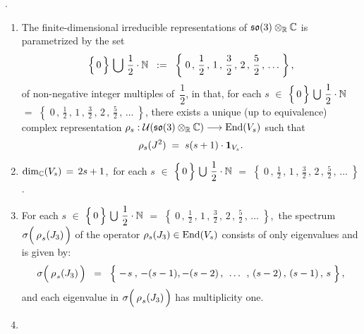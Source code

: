 
\begin{theorem}
{\color{white}.}\vskip -0.1cm
\noindent
\begin{enumerate}
\item
	The finite-dimensional irreducible representations of $\mathfrak{so}(3) \otimes_{\mathbb{R}} \mathbb{C}$ is parametrized by the set
	\begin{equation*}
	\left\{\,\overset{{\color{white}.}}{0}\,\right\} \,\bigcup\, \dfrac{1}{2} \cdot \N
	\;\; := \;\;
		\left\{\;0 \,,\, \dfrac{1}{2} \,,\, 1 \,,\, \frac{3}{2} \,,\, 2 \,,\, \frac{5}{2} \,,\, \ldots \;\right\},
	\end{equation*}
	of non-negative integer multiples of \,$\dfrac{1}{2}$, in that, for each
	$s$
	$\in$ $\left\{\,\overset{{\color{white}.}}{0}\,\right\} \,\bigcup\, \dfrac{1}{2} \cdot \N$
	$=$ $\left\{\; 0 \,,\, \frac{1}{2}\,,\, 1\,,\, \frac{3}{2}\,,\, 2\,,\, \frac{5}{2}\,,\, \ldots \;\right\}$,
	there exists a unique (up to equivalence) complex representation
	$\rho_{s} : \mathcal{U}(\mathfrak{so}(3)\otimes_{\mathbb{R}}\mathbb{C}) \longrightarrow \textnormal{End}(V_{s})$
	such that
	\begin{equation*}
	\rho_{s}(J^{2}) \; = \; s(s+1)\cdot\textnormal{\textbf{1}}_{V_{s}}.
	\end{equation*}
\item
	$\dim_{\mathbb{C}}(V_{s}) \, = \, 2s + 1$,\, for each
	$s$
	$\in$ $\left\{\,\overset{{\color{white}.}}{0}\,\right\} \,\bigcup\, \dfrac{1}{2} \cdot \N$
	$=$ $\left\{\; 0 \,,\, \frac{1}{2}\,,\, 1\,,\, \frac{3}{2}\,,\, 2\,,\, \frac{5}{2}\,,\, \ldots \;\right\}$.
\item
	For each
	$s$
	$\in$ $\left\{\,\overset{{\color{white}.}}{0}\,\right\} \,\bigcup\, \dfrac{1}{2} \cdot \N$
	$=$ $\left\{\; 0 \,,\, \frac{1}{2}\,,\, 1\,,\, \frac{3}{2}\,,\, 2\,,\, \frac{5}{2}\,,\, \ldots \;\right\}$,\,
	the spectrum
	$\sigma\!\left(\,\overset{{\color{white}-}}{\rho}_{s}(J_{3})\,\right)$
	of the operator $\rho_{s}(J_{3}) \in \textnormal{End}(V_{s})$
	consists of only eigenvalues and is given by:
	\begin{equation*}
	\sigma\!\left(\,\overset{{\color{white}-}}{\rho}_{s}(J_{3})\,\right)
	\;\; = \;\;
		\left\{\;
			-\overset{{\color{white}-}}{s} \,,\, -(s-1), -(s-2)
			\,,\;\, \ldots \,\;,\,
			(s-2) \,,\, (s-1) \,,\, s
			\;\right\},
	\end{equation*}
	and each eigenvalue in 
	$\sigma\!\left(\,\overset{{\color{white}-}}{\rho}_{s}(J_{3})\,\right)$
	has multiplicity one.
\item

\end{enumerate}
\end{theorem}
